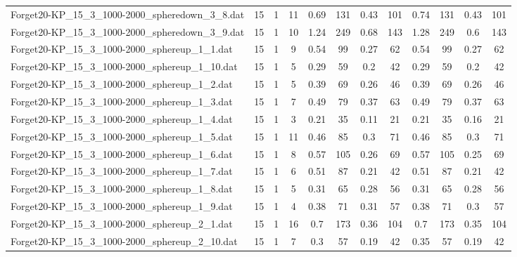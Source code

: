 \begin{sidewaystable}[!ht]
{\begin{tabular}{lccccccccccc}
Forget20-KP\_15\_3\_1000-2000\_spheredown\_3\_8.dat & 15 & 1 & 11 & 0.69 & 131 &  \textcolor{blue2}{0.43} & 101 & 0.74 & 131 &  \textcolor{blue2}{0.43} & 101 \\
Forget20-KP\_15\_3\_1000-2000\_spheredown\_3\_9.dat & 15 & 1 & 10 & 1.24 & 249 & 0.68 & 143 & 1.28 & 249 &  \textcolor{blue2}{0.6} & 143 \\
Forget20-KP\_15\_3\_1000-2000\_sphereup\_1\_1.dat & 15 & 1 & 9 & 0.54 & 99 &  \textcolor{blue2}{0.27} & 62 & 0.54 & 99 &  \textcolor{blue2}{0.27} & 62 \\
Forget20-KP\_15\_3\_1000-2000\_sphereup\_1\_10.dat & 15 & 1 & 5 & 0.29 & 59 &  \textcolor{blue2}{0.2} & 42 & 0.29 & 59 &  \textcolor{blue2}{0.2} & 42 \\
Forget20-KP\_15\_3\_1000-2000\_sphereup\_1\_2.dat & 15 & 1 & 5 & 0.39 & 69 &  \textcolor{blue2}{0.26} & 46 & 0.39 & 69 &  \textcolor{blue2}{0.26} & 46 \\
Forget20-KP\_15\_3\_1000-2000\_sphereup\_1\_3.dat & 15 & 1 & 7 & 0.49 & 79 &  \textcolor{blue2}{0.37} & 63 & 0.49 & 79 &  \textcolor{blue2}{0.37} & 63 \\
Forget20-KP\_15\_3\_1000-2000\_sphereup\_1\_4.dat & 15 & 1 & 3 & 0.21 & 35 &  \textcolor{blue2}{0.11} & 21 & 0.21 & 35 & 0.16 & 21 \\
Forget20-KP\_15\_3\_1000-2000\_sphereup\_1\_5.dat & 15 & 1 & 11 & 0.46 & 85 &  \textcolor{blue2}{0.3} & 71 & 0.46 & 85 &  \textcolor{blue2}{0.3} & 71 \\
Forget20-KP\_15\_3\_1000-2000\_sphereup\_1\_6.dat & 15 & 1 & 8 & 0.57 & 105 & 0.26 & 69 & 0.57 & 105 &  \textcolor{blue2}{0.25} & 69 \\
Forget20-KP\_15\_3\_1000-2000\_sphereup\_1\_7.dat & 15 & 1 & 6 & 0.51 & 87 &  \textcolor{blue2}{0.21} & 42 & 0.51 & 87 &  \textcolor{blue2}{0.21} & 42 \\
Forget20-KP\_15\_3\_1000-2000\_sphereup\_1\_8.dat & 15 & 1 & 5 & 0.31 & 65 &  \textcolor{blue2}{0.28} & 56 & 0.31 & 65 &  \textcolor{blue2}{0.28} & 56 \\
Forget20-KP\_15\_3\_1000-2000\_sphereup\_1\_9.dat & 15 & 1 & 4 & 0.38 & 71 & 0.31 & 57 & 0.38 & 71 &  \textcolor{blue2}{0.3} & 57 \\
Forget20-KP\_15\_3\_1000-2000\_sphereup\_2\_1.dat & 15 & 1 & 16 & 0.7 & 173 & 0.36 & 104 & 0.7 & 173 &  \textcolor{blue2}{0.35} & 104 \\
Forget20-KP\_15\_3\_1000-2000\_sphereup\_2\_10.dat & 15 & 1 & 7 & 0.3 & 57 &  \textcolor{blue2}{0.19} & 42 & 0.35 & 57 &  \textcolor{blue2}{0.19} & 42 \\

\end{tabular}}
\end{sidewaystable}
